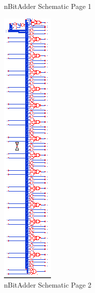 \documentclass[11pt]{article}
\begin{document}
\begin{figure}[H]
			\caption{nBitAdder Schematic Page 1} 
			\label{fig:nBitAdder-Schematic-Page-1} 
		\end{figure}
		
		
		\begin{figure}[H] 
			\centering 
			\includegraphics[width=\textwidth,height=\dimexpr\textheight-4\baselineskip-\abovecaptionskip-\belowcaptionskip\relax,keepaspectratio]{"Pictures/nBitAdder Schematic Page 2"}
			\caption{nBitAdder Schematic Page 2} 
			\label{fig:nBitAdder-Schematic-Page-2} 
		\end{figure}
	
\end{document}
